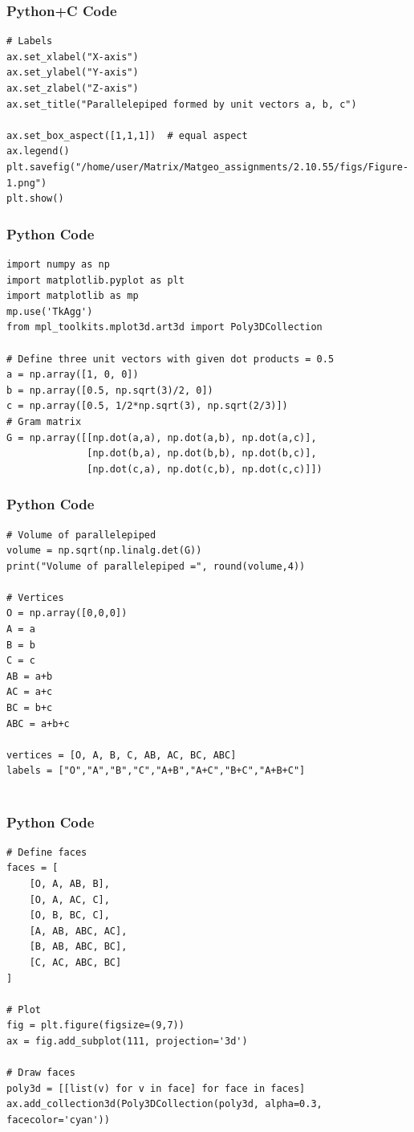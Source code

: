 \documentclass{beamer}
\begin{document}
\begin{frame}[fragile]
    \frametitle{Python+C Code}
    \begin{lstlisting}
# Labels
ax.set_xlabel("X-axis")
ax.set_ylabel("Y-axis")
ax.set_zlabel("Z-axis")
ax.set_title("Parallelepiped formed by unit vectors a, b, c")

ax.set_box_aspect([1,1,1])  # equal aspect
ax.legend()
plt.savefig("/home/user/Matrix/Matgeo_assignments/2.10.55/figs/Figure-1.png")
plt.show()
    \end{lstlisting}
\end{frame}


\begin{frame}[fragile]
    \frametitle{Python Code}
    \begin{lstlisting}
import numpy as np
import matplotlib.pyplot as plt
import matplotlib as mp
mp.use('TkAgg')
from mpl_toolkits.mplot3d.art3d import Poly3DCollection

# Define three unit vectors with given dot products = 0.5
a = np.array([1, 0, 0])
b = np.array([0.5, np.sqrt(3)/2, 0])                 
c = np.array([0.5, 1/2*np.sqrt(3), np.sqrt(2/3)])   
# Gram matrix
G = np.array([[np.dot(a,a), np.dot(a,b), np.dot(a,c)],
              [np.dot(b,a), np.dot(b,b), np.dot(b,c)],
              [np.dot(c,a), np.dot(c,b), np.dot(c,c)]])

    \end{lstlisting}
\end{frame}

\begin{frame}[fragile]
    \frametitle{Python Code}
    \begin{lstlisting}
# Volume of parallelepiped
volume = np.sqrt(np.linalg.det(G))
print("Volume of parallelepiped =", round(volume,4))

# Vertices
O = np.array([0,0,0])
A = a
B = b
C = c
AB = a+b
AC = a+c
BC = b+c
ABC = a+b+c

vertices = [O, A, B, C, AB, AC, BC, ABC]
labels = ["O","A","B","C","A+B","A+C","B+C","A+B+C"]


    \end{lstlisting}
\end{frame}

\begin{frame}[fragile]
    \frametitle{Python Code}
    \begin{lstlisting}
# Define faces
faces = [
    [O, A, AB, B],
    [O, A, AC, C],
    [O, B, BC, C],
    [A, AB, ABC, AC],
    [B, AB, ABC, BC],
    [C, AC, ABC, BC]
]

# Plot
fig = plt.figure(figsize=(9,7))
ax = fig.add_subplot(111, projection='3d')

# Draw faces
poly3d = [[list(v) for v in face] for face in faces]
ax.add_collection3d(Poly3DCollection(poly3d, alpha=0.3, facecolor='cyan'))

    \end{lstlisting}
\end{frame}
\end{document}

